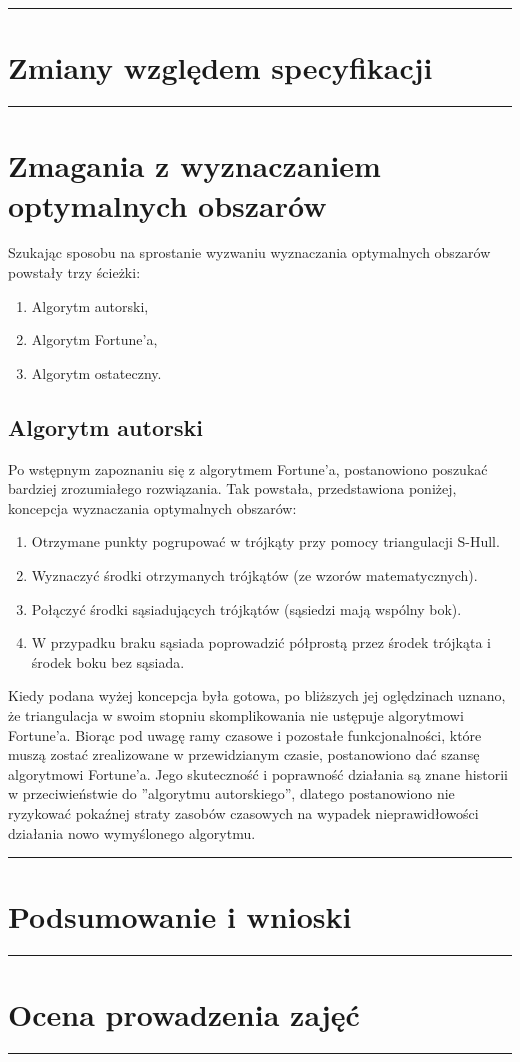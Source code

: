 \documentclass[a4paper,11pt]{article}
\newcommand{\linia}{\rule{\linewidth}{0.4mm}}
\begin{document}
\noindent\linia
\section{Zmiany względem specyfikacji}

\noindent\linia
\section{Zmagania z wyznaczaniem optymalnych obszarów}
Szukając sposobu na sprostanie wyzwaniu wyznaczania optymalnych obszarów powstały trzy ścieżki:
\begin{enumerate}
\item Algorytm autorski,
\item Algorytm Fortune'a,
\item Algorytm ostateczny.
\end{enumerate}
\subsection{Algorytm autorski}
Po wstępnym zapoznaniu się z algorytmem Fortune'a, postanowiono poszukać bardziej zrozumiałego rozwiązania.
Tak powstała, przedstawiona poniżej, koncepcja wyznaczania optymalnych obszarów:
\begin{enumerate}
\item Otrzymane punkty pogrupować w trójkąty przy pomocy triangulacji S-Hull.
\item Wyznaczyć środki otrzymanych trójkątów (ze wzorów matematycznych).
\item Połączyć środki sąsiadujących trójkątów (sąsiedzi mają wspólny bok).
\item W przypadku braku sąsiada poprowadzić półprostą przez środek trójkąta i środek boku bez sąsiada.
\end{enumerate}
Kiedy podana wyżej koncepcja była gotowa, po bliższych jej oględzinach uznano, że triangulacja w swoim stopniu skomplikowania nie ustępuje algorytmowi Fortune'a.
Biorąc pod uwagę ramy czasowe i pozostałe funkcjonalności, które muszą zostać zrealizowane w przewidzianym czasie, postanowiono dać szansę algorytmowi Fortune'a. Jego skuteczność i poprawność działania są znane historii w przeciwieństwie do ''algorytmu autorskiego'', dlatego postanowiono nie ryzykować pokaźnej straty zasobów czasowych na wypadek nieprawidłowości działania nowo wymyślonego algorytmu.
\noindent\linia
\section{Podsumowanie i wnioski}

\noindent\linia
\section{Ocena prowadzenia zajęć}

\noindent\linia
\end{document}
